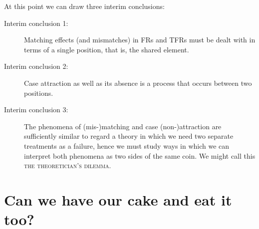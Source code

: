 \documentclass[output=paper]{langsci/langscibook}
\begin{document}
\begin{refcontext}
\begin{figure}[H]
\end{figure}

At this point we can draw three interim conclusions:

\begin{description}
\item[Interim conclusion 1:] Matching effects (and mismatches) in
\glspl{FR} and \glspl{TFR} must be dealt with in terms of a single position,
that is, the shared element.

\item[Interim conclusion 2:] Case attraction as well as its absence is a
process that occurs between two positions.

\item[Interim conclusion 3:] The phenomena of (mis-)matching and case
(non-)at\-trac\-tion are sufficiently similar to regard a theory in which we
need two separate treatments as a failure, hence we must study ways in which we
can interpret both phenomena as two sides of the same coin. We might call this
\textsc{the theoretician's dilemma}.
\end{description}

\section{Can we have our cake and eat it too?}\label{sec:15.3}


\end{refcontext}
\end{document}
